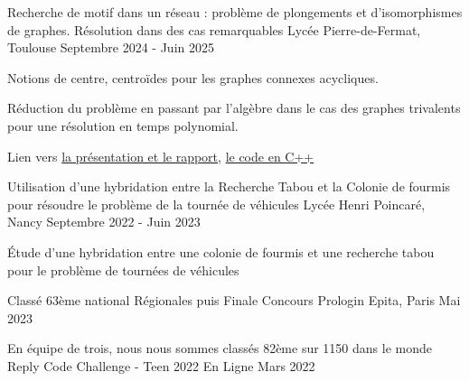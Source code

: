 

\begin{cventries}
  \cventry
    {}
    {Recherche de motif dans un réseau : problème de plongements et d'isomorphismes de graphes. Résolution dans des cas remarquables}
    {Lycée Pierre-de-Fermat, Toulouse} %
    {Septembre 2024 - Juin 2025}
    {
        \begin{cvitems}
            \item {Notions de centre, centroïdes pour les graphes connexes acycliques.}
            \item {Réduction du problème en passant par l'algèbre dans le cas des graphes trivalents pour une résolution en temps polynomial.}
            \item Lien vers \href{https://github.com/Aur3m/tipe2-pres/}{la présentation et le rapport}, \href{https://github.com/Aur3m/tipe2}{le code en C++} 
        \end{cvitems}
    }
    
  \cventry
    {} %
    {Utilisation d'une hybridation entre la Recherche Tabou et la Colonie de fourmis pour résoudre le problème de la tournée de véhicules} %
    {Lycée Henri Poincaré, Nancy} %
    {Septembre 2022 - Juin 2023} %
    {
      \begin{cvitems} %
        \item {Étude d'une hybridation entre une colonie de fourmis et une recherche tabou pour le problème de tournées de véhicules}
      \end{cvitems}
    }
    
  \cventry
    {Classé 63ème national} %
    {Régionales puis Finale Concours Prologin} %
    {Epita, Paris} %
    {Mai 2023} %
    {
      \begin{cvitems} %
        \end{cvitems}
    }

  \cventry
    {En équipe de trois, nous nous sommes classés 82ème sur 1150 dans le monde} %
    {Reply Code Challenge - Teen 2022} %
    {En Ligne} %
    {Mars 2022} %
    {
      \begin{cvitems} %
        \end{cvitems}
    }


\end{cventries}
